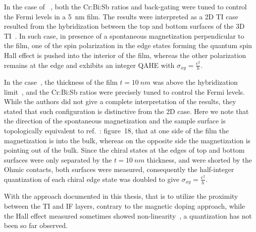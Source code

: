 In the case of \citeauthor{Chang2013}~\cite{Chang2013}, both the Cr:Bi:Sb ratios and back-gating were tuned to control the Fermi levels in a \SI{5}{nm} film. The results were interpreted as a 2D TI case resulted from the hybridization between the top and bottom surfaces of the 3D TI~\cite{QAH_TI_Yu, 2d_crossover}. In such case, in presence of a spontaneous magnetization perpendicular to the film, one of the spin polarization in the edge states forming the quantum spin Hall effect is pushed into the interior of the film, whereas the other polarization remains at the edge and exhibits an integer QAHE with $\sigma_{xy} = \frac{e^2}{h}$.

In the \citeauthor{Chang2013} case~\cite{Chang2013}, the thickness of the film $t=\SI{10}{nm}$ was above the hybridization limit~\cite{ARPES_thickness}, and the Cr:Bi:Sb ratios were precisely tuned to control the Fermi levels. While the authors did not give a complete interpretation of the results, they stated that such configuration is distinctive from the 2D case. Here we note that the direction of the spontaneous magnetization and the sample surface is topologically equivalent to ref.~\cite{TI_Col}: figure~18, that at one side of the film the magnetization is into the bulk, whereas on the opposite side the magnetization is pointing out of the bulk. Since the chiral states at the edges of top and bottom surfaces were only separated by the $t=\SI{10}{nm}$ thickness, and were shorted by the Ohmic contacts, both surfaces were measured, consequently the half-integer quantization of each chiral edge state was doubled to give $\sigma_{xy} = \frac{e^2}{h}$.

With the approach documented in this thesis, that is to utilize the proximity between the TI and IF layers, contrary to the magnetic doping approach, while the Hall effect measured sometimes showed non-linearity~\cite{Samarth2017, Petta2014}, a quantization has not been so far observed.